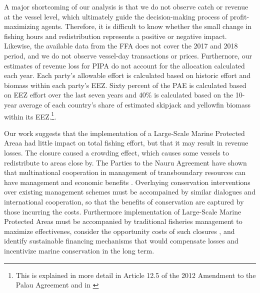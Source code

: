 \documentclass[9p,twocolumn,twoside,lineno]{pnas-new}
\begin{document}
A major shortcoming of our analysis is that we do not observe catch or revenue at the vessel level, which ultimately guide the decision-making process of profit-maximizing agents. Therefore, it is difficult to know whether the small change in fishing hours and redistribution represents a positive or negative impact. Likewise, the available data from the FFA does not cover the 2017 and 2018 period, and we do not observe vessel-day transactions or prices. Furthernore, our estimates of revenue loss for PIPA do not account for the allocation calculated each year. Each party’s allowable effort is calculated based on historic effort and biomass within each party’s EEZ. Sixty percent of the PAE is calculated based on EEZ effort over the last seven years and 40\% is calculated based on the 10-year average of each country’s share of estimated skipjack and yellowfin biomass within its EEZ.\footnote{This is explained in more detail in Article 12.5 of the 2012 Amendment to the Palau Agreement and in \cite{Hagrannsoknir2014}}.

Our work suggests that the implementation of a Large-Scale Marine Protected Areaa had little impact on total fishing effort, but that it may result in revenue losses. The closure caused a crowding effect, which causes some vessels to redistribute to areas close by. The Parties to the Nauru Agreement have shown that multinational cooperation in management of transboundary resources can have management and economic benefits \cite{lehodey_1997,aqorau_2018}. Overlaying conservation interventions over existing management schemes must be accompained by similar dialogues and international cooperation, so that the benefits of conservation are captured by those incurring the costs. Furthermore implementation of Large-Scale Marine Protected Areas must be accompanied by traditional fisheries management to maximize effectivenes, consider the opportunity costs of such closures \cite{smith_2010}, and identify sustainable financing mechanisms\cite{mallin_2019} that would compensate losses and incentivize marine conservation in the long term.
\end{document}
